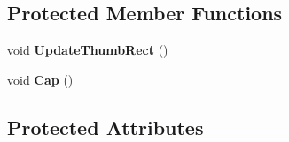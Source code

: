 \subsection*{Protected Member Functions}
\begin{DoxyCompactItemize}
\item 
\hypertarget{class_c_d_x_u_t_scroll_bar_aab1de864a32b8813b814a67cc232eeed}{void {\bfseries Update\+Thumb\+Rect} ()}\label{class_c_d_x_u_t_scroll_bar_aab1de864a32b8813b814a67cc232eeed}

\item 
\hypertarget{class_c_d_x_u_t_scroll_bar_a2a680f2ce9c5fa971ccc9b618de9e8fa}{void {\bfseries Cap} ()}\label{class_c_d_x_u_t_scroll_bar_a2a680f2ce9c5fa971ccc9b618de9e8fa}

\end{DoxyCompactItemize}
\subsection*{Protected Attributes}
